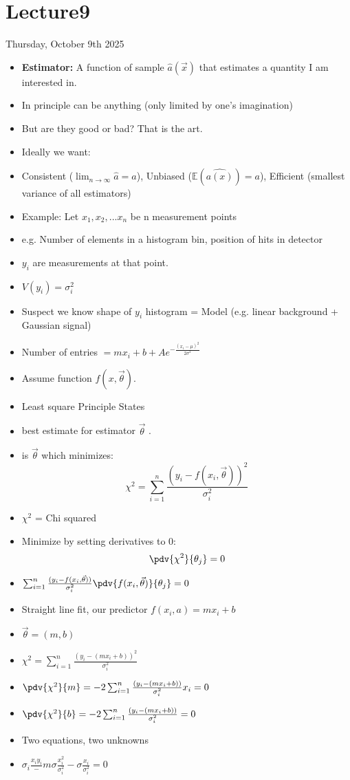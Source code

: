 \section{Lecture9}

Thursday, October 9th 2025

\begin{itemize}
    \item \textbf{Estimator:} A function of sample $\hat{a}(\vec{x})$ that estimates a quantity I am interested in.
    \item In principle can be anything (only limited by one's imagination)
    \item But are they good or bad? That is the art.
    \item Ideally we want:
    \item Consistent ($\lim_{n \rightarrow \infty} \hat{a} = a$), Unbiased ($\mathbb{E}(\hat{a(x)}) = a$), Efficient (smallest variance of all estimators)
    \item Example: Let $x_1, x_2, ... x_n$  be n measurement points
    \item e.g. Number of elements in a histogram bin, position of hits in detector
    \item $y_i$ are measurements at that point.
    \item $V(y_i) = \sigma_i^2$
    \item Suspect we know shape of $y_i$ histogram = Model (e.g. linear background + Gaussian signal)
    \item Number of entries $= m x_i + b + A e^{-\frac{(x_i - \mu)^2}{2 \sigma^2}}$
    \item Assume function $f(x, \vec{\theta})$.
    \item Least square Principle States
    \item best estimate for estimator $\vec{\theta}$ .
    \item is $\vec{\theta}$ which minimizes:
          \[ \chi^2 = \sum_{i=1}^{n} \frac{(y_i - f(x_i, \vec{\theta}))^2}{\sigma_i^2} \]
    \item $\chi^2$ = Chi squared
    \item Minimize by setting derivatives to 0:
          \[ \pdv{\chi^2}{\theta_j} = 0 \]


    \item $\sum_{i=1}^{n} \frac{(y_i - f(x_i, \vec{\theta}))}{\sigma_i^2} \pdv{f(x_i, \vec{\theta})}{\theta_j} = 0$
    \item Straight line fit, our predictor $f(x_i, a) = m x_i + b$
    \item $\vec{\theta} = (m, b)$
    \item $\chi^2 = \sum_{i=1}^{n} \frac{(y_i - (m x_i + b))^2}{\sigma_i^2}$
    \item $\pdv{\chi^2}{m} = -2 \sum_{i=1}^{n} \frac{(y_i - (m x_i + b))}{\sigma_i^2} x_i = 0$
    \item $\pdv{\chi^2}{b} = -2 \sum_{i=1}^{n} \frac{(y_i - (m x_i + b))}{\sigma_i^2} = 0$
    \item Two equations, two unknowns
    \item $\sigma_i \frac{x_i y_i} - m\sigma \frac{x_i^2}{\sigma_i^2} - \sigma \frac{x_i}{\sigma_i^2} = 0$



\end{itemize}
